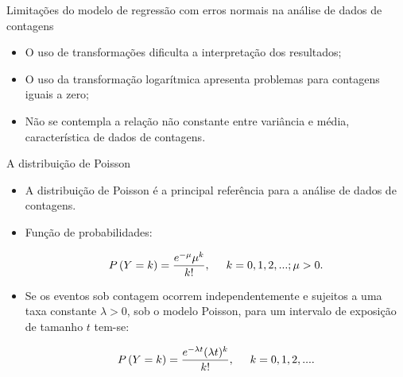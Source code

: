 \documentclass[10pt, aspectratio=169]{beamer}
\begin{document}



\begin{frame}{Limitações do modelo de regressão com erros normais na análise de dados de contagens}
    
    
    \vspace{0,2cm}
    
    \begin{itemize}
 
        \item O uso de transformações dificulta a interpretação dos resultados;
        
        \vspace{0,5cm}
        
        \item O uso da transformação logarítmica apresenta problemas para contagens iguais a zero;
        
        \vspace{0,5cm}
        
        \item Não se contempla a relação não constante entre variância e média, característica de  dados de contagens.
        
        
    \end{itemize}
    
\end{frame}



\begin{frame}{A distribuição de Poisson}
    
    \begin{itemize}
        \item A distribuição de Poisson é a principal referência para a análise de dados de contagens.
 \vspace{0,3cm}       
        \item Função de probabilidades:

        
$$
    P\left ( Y=k \right )=\frac{e^{-\mu}\mu^{k}}{k!},\hspace{5mm}k=0,1,2,...; \mu>0.
$$
 
   \vspace{0,2cm}    
   
       \item Se os eventos sob contagem  ocorrem independentemente e sujeitos a uma taxa constante $\lambda >0$, sob o modelo Poisson,  para um intervalo de exposição de tamanho $t$ tem-se: 
  
$$
    P\left ( Y=k \right )=\frac{e^{-\lambda t}(\lambda t)^{k}}{k!},\hspace{5mm}k=0,1,2,....
$$
        \end{itemize}
        
\end{frame}
\end{document}
